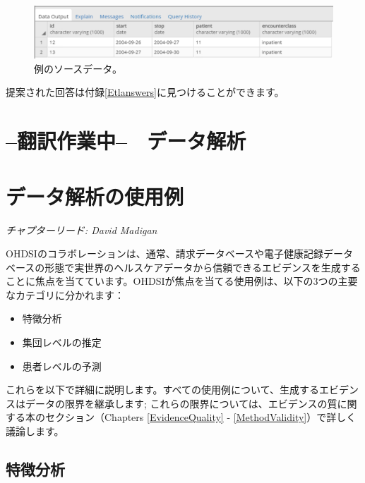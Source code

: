 \documentclass[
  11pt]{book}
\providecommand{\tightlist}{%
  \setlength{\itemsep}{0pt}\setlength{\parskip}{0pt}}
\theoremstyle{definition}
\theoremstyle{definition}
\theoremstyle{definition}
\theoremstyle{definition}
\theoremstyle{remark}
\begin{document}
\begin{figure}

{\centering \includegraphics[width=1\linewidth]{images/ExtractTransformLoad/exerciseSourceData} 

}

\caption{例のソースデータ。}\label{fig:exerciseSourceData}
\end{figure}

提案された回答は付録\ref{Etlanswers}に見つけることができます。

\chapter*{--翻訳作業中--　データ解析}\label{ux7ffbux8a33ux4f5cux696dux4e2d-ux30c7ux30fcux30bfux89e3ux6790}

\chapter{データ解析の使用例}\label{DataAnalyticsUseCases}

\emph{チャプターリード: David Madigan}

OHDSIのコラボレーションは、通常、請求データベースや電子健康記録データベースの形態で実世界のヘルスケアデータから信頼できるエビデンスを生成することに焦点を当てています。OHDSIが焦点を当てる使用例は、以下の3つの主要なカテゴリに分かれます：

\begin{itemize}
\tightlist
\item
  特徴分析
\item
  集団レベルの推定
\item
  患者レベルの予測
\end{itemize}

これらを以下で詳細に説明します。すべての使用例について、生成するエビデンスはデータの限界を継承します; これらの限界については、エビデンスの質に関する本のセクション（Chapters \ref{EvidenceQuality} - \ref{MethodValidity}）で詳しく議論します。

\section{特徴分析}\label{ux7279ux5fb4ux5206ux6790}
\end{document}
